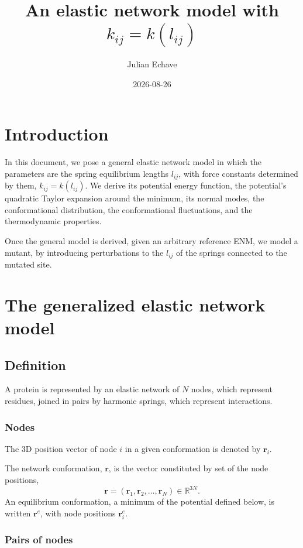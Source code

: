 \documentclass[11pt]{article}
\title{An elastic network model with $k_{ij}=k(l_{ij})$}
\author{Julian Echave}
\date{2026-08-26}
\newcommand{\rr}{\mathbf{r}}
\newcommand{\re}{\rr^{e}}
\newcommand{\lij}{l_{ij}}
\newcommand{\kij}{k_{ij}}
\begin{document}
\maketitle

\section{Introduction}

In this document,  we pose a general elastic network model in which the parameters are the spring equilibrium lengths $\lij$, with force constants determined by them, $\kij = k(\lij)$. We derive its potential energy function, the potential's quadratic Taylor expansion around the minimum, its normal modes, the conformational distribution, the conformational fluctuations, and the thermodynamic properties. 

Once the general model is derived, given an arbitrary reference ENM, we model a mutant, by introducing perturbations to the $\lij$ of the springs connected to the mutated site.


\section{The generalized elastic network model}
\label{sec:model}

\subsection{Definition}

A protein is represented by an elastic network of $N$ nodes, which represent residues, joined in pairs by harmonic springs, which represent interactions.

\subsubsection{Nodes}

The 3D position vector of node $i$ in a given conformation is denoted by $\rr_i$. 

The network conformation, $\rr$, is the vector constituted by set of the node positions,
\begin{equation}
\rr = (\rr_1, \rr_2, \ldots, \rr_N) \in \mathbb{R}^{3N}.
\end{equation}
An equilibrium conformation, a minimum of the potential defined below, is written $\re$, with node positions $\re_i$.

\subsubsection{Pairs of nodes}
\end{document}
